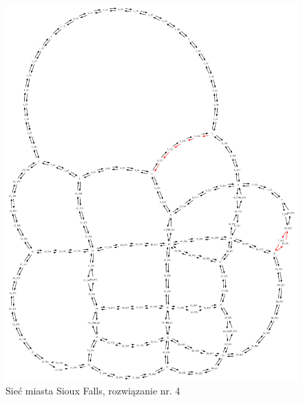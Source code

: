 \documentclass[twoside,12pt]{report}
\begin{document}
\begin{figure}[ht]
\centering
\includegraphics[totalheight=0.580\textheight, angle=90]{img/sioux-out/4/network2}
\caption{Sieć miasta Sioux Falls, rozwiązanie nr. 4}
\label{sioux4}
\end{figure}
\end{document}

